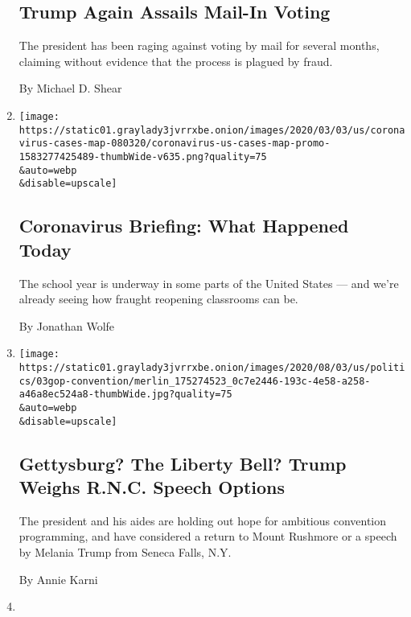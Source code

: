 \begin{enumerate}
{  \subsection{Trump Again Assails Mail-In
  Voting}\label{trump-again-assails-mail-in-voting}}

  The president has been raging against voting by mail for several
  months, claiming without evidence that the process is plagued by
  fraud.

  By Michael D. Shear
\item
  \href{/2020/08/03/us/coronavirus-today.html}{}

  \texttt{[image: https://static01.graylady3jvrrxbe.onion/images/2020/03/03/us/coronavirus-cases-map-080320/coronavirus-us-cases-map-promo-1583277425489-thumbWide-v635.png?quality=75\\\&auto=webp\\\&disable=upscale]}

  \hypertarget{coronavirus-briefing-what-happened-today}{%
  \subsection{Coronavirus Briefing: What Happened
  Today}\label{coronavirus-briefing-what-happened-today}}

  The school year is underway in some parts of the United States --- and
  we're already seeing how fraught reopening classrooms can be.

  By Jonathan Wolfe
\item
  \href{/2020/08/03/us/politics/trump-rnc-speech.html}{}

  \texttt{[image: https://static01.graylady3jvrrxbe.onion/images/2020/08/03/us/politics/03gop-convention/merlin\_175274523\_0c7e2446-193c-4e58-a258-a46a8ec524a8-thumbWide.jpg?quality=75\\\&auto=webp\\\&disable=upscale]}

  \hypertarget{gettysburg-the-liberty-bell-trump-weighs-rnc-speech-options}{%
  \subsection{Gettysburg? The Liberty Bell? Trump Weighs R.N.C. Speech
  Options}\label{gettysburg-the-liberty-bell-trump-weighs-rnc-speech-options}}

  The president and his aides are holding out hope for ambitious
  convention programming, and have considered a return to Mount Rushmore
  or a speech by Melania Trump from Seneca Falls, N.Y.

  By Annie Karni
\item
  \href{/2020/08/03/world/europe/italy-coronavirus-prostitution-sex-work.html}{}


\end{enumerate}

